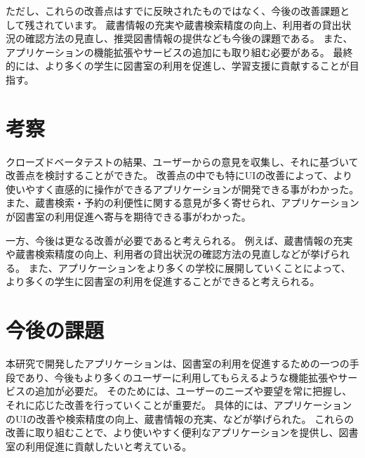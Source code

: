 \documentclass[pdflatex,ja=standard,twocolumn]{bxjsarticle}
\begin{document}
ただし、これらの改善点はすでに反映されたものではなく、今後の改善課題として残されています。
蔵書情報の充実や蔵書検索精度の向上、利用者の貸出状況の確認方法の見直し、推奨図書情報の提供なども今後の課題である。
また、アプリケーションの機能拡張やサービスの追加にも取り組む必要がある。
最終的には、より多くの学生に図書室の利用を促進し、学習支援に貢献することが目指す。

\section{考察}
クローズドベータテストの結果、ユーザーからの意見を収集し、それに基づいて改善点を検討することができた。
改善点の中でも特にUIの改善によって、より使いやすく直感的に操作ができるアプリケーションが開発できる事がわかった。
また、蔵書検索・予約の利便性に関する意見が多く寄せられ、アプリケーションが図書室の利用促進へ寄与を期待できる事がわかった。

一方、今後は更なる改善が必要であると考えられる。
例えば、蔵書情報の充実や蔵書検索精度の向上、利用者の貸出状況の確認方法の見直しなどが挙げられる。
また、アプリケーションをより多くの学校に展開していくことによって、より多くの学生に図書室の利用を促進することができると考えられる。
\section{今後の課題}
本研究で開発したアプリケーションは、図書室の利用を促進するための一つの手段であり、今後もより多くのユーザーに利用してもらえるような機能拡張やサービスの追加が必要だ。
そのためには、ユーザーのニーズや要望を常に把握し、それに応じた改善を行っていくことが重要だ。
具体的には、アプリケーションのUIの改善や検索精度の向上、蔵書情報の充実、などが挙げられた。
これらの改善に取り組むことで、より使いやすく便利なアプリケーションを提供し、図書室の利用促進に貢献したいと考えている。
\end{document}
